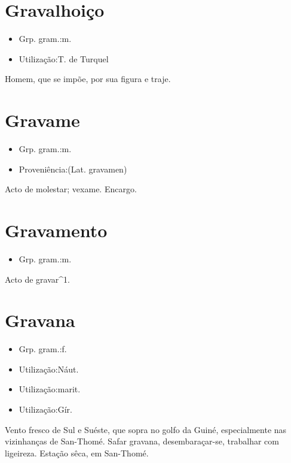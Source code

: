 \section{Gravalhoiço}
\begin{itemize}
\item {Grp. gram.:m.}
\end{itemize}
\begin{itemize}
\item {Utilização:T. de Turquel}
\end{itemize}
Homem, que se impõe, por sua figura e traje.
\section{Gravame}
\begin{itemize}
\item {Grp. gram.:m.}
\end{itemize}
\begin{itemize}
\item {Proveniência:(Lat. \textunderscore gravamen\textunderscore )}
\end{itemize}
Acto de molestar; vexame.
Encargo.
\section{Gravamento}
\begin{itemize}
\item {Grp. gram.:m.}
\end{itemize}
Acto de gravar^1.
\section{Gravana}
\begin{itemize}
\item {Grp. gram.:f.}
\end{itemize}
\begin{itemize}
\item {Utilização:Náut.}
\end{itemize}
\begin{itemize}
\item {Utilização:marit.}
\end{itemize}
\begin{itemize}
\item {Utilização:Gír.}
\end{itemize}
Vento fresco de Sul e Suéste, que sopra no golfo da Guiné, especialmente nas vizinhanças de San-Thomé.
\textunderscore Safar gravana\textunderscore , desembaraçar-se, trabalhar com ligeireza.
Estação sêca, em San-Thomé.
